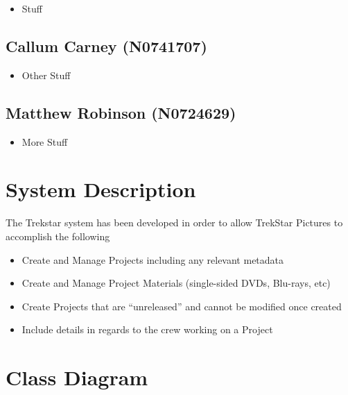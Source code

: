 \documentclass[
  english,
  a4paper,
,tablecaptionabove
]{scrartcl}
\providecommand{\tightlist}{%
  \setlength{\itemsep}{0pt}\setlength{\parskip}{0pt}}
\begin{document}
\begin{itemize}
\tightlist
\item
  Stuff
\end{itemize}

\hypertarget{callum-carney-n0741707}{%
\subsection{Callum Carney (N0741707)}\label{callum-carney-n0741707}}

\begin{itemize}
\tightlist
\item
  Other Stuff
\end{itemize}

\hypertarget{matthew-robinson-n0724629}{%
\subsection{Matthew Robinson
(N0724629)}\label{matthew-robinson-n0724629}}

\begin{itemize}
\tightlist
\item
  More Stuff
\end{itemize}

\newpage

\hypertarget{system-description}{%
\section{System Description}\label{system-description}}

The Trekstar system has been developed in order to allow TrekStar
Pictures to accomplish the following

\begin{itemize}
\tightlist
\item
  Create and Manage Projects including any relevant metadata
\item
  Create and Manage Project Materials (single-sided DVDs, Blu-rays, etc)
\item
  Create Projects that are \enquote{unreleased} and cannot be modified
  once created
\item
  Include details in regards to the crew working on a Project
\end{itemize}

\newpage

\hypertarget{class-diagram}{%
\section{Class Diagram}\label{class-diagram}}
\end{document}
